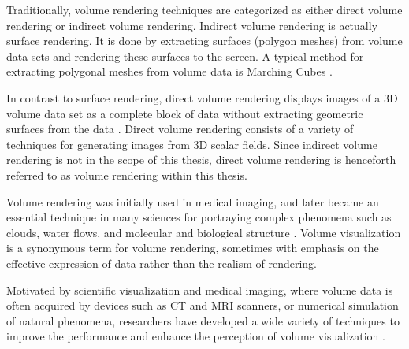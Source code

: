 


Traditionally, volume rendering techniques are categorized as either direct volume rendering or indirect volume rendering.
Indirect volume rendering is actually surface rendering. It is done by extracting surfaces (polygon meshes) from volume data sets and rendering these surfaces to the screen. A typical method for extracting polygonal meshes from volume data is Marching Cubes \cite{lorensen_marching_1987}.

In contrast to surface rendering, direct volume rendering displays images of a 3D volume data set as a complete block of data without extracting geometric surfaces from the data \cite{levoy_display_1988}. Direct volume rendering consists of a variety of techniques for generating images from 3D scalar fields.
Since indirect volume rendering is not in the scope of this thesis, direct volume rendering is henceforth referred to as volume rendering within this thesis.

Volume rendering was initially used in medical imaging, and later became an essential technique in many sciences for portraying complex phenomena such as clouds, water flows, and molecular and biological structure \cite{rosenblum_scientific_1994}.
Volume visualization is a synonymous term for volume rendering, sometimes with emphasis on the effective expression of 
data rather than the realism of rendering.

Motivated by scientific visualization and medical imaging, where volume data is often acquired by devices such as CT and MRI scanners, or numerical simulation of natural phenomena, researchers have developed a wide variety of techniques to improve the performance and enhance the perception of volume visualization \cite{corcoran_enhancing_2013}.

